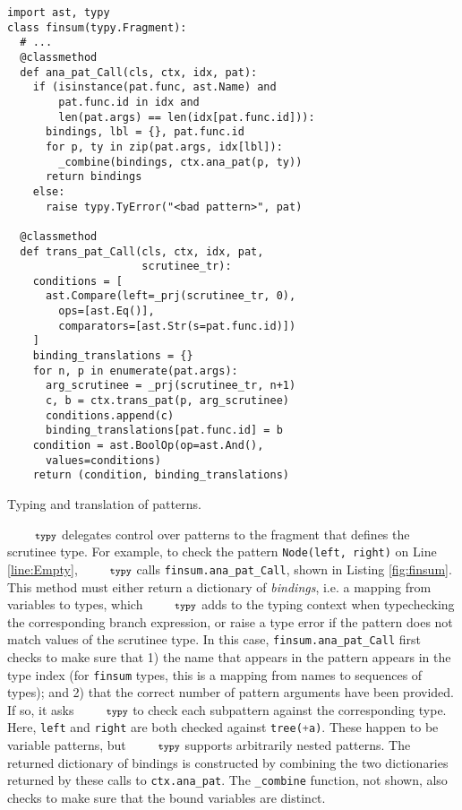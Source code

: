 \documentclass[10pt]{sigplanconf}
\newcommand{\typy}{\texttt{\footnotesize typy}}
\newcommand{\lip}[1]{\lstinline[language=Python,basicstyle=\ttfamily\footnotesize,morekeywords={with},deletendkeywords={tuple,buffer,map}]{#1}}
\newcommand{\li}[1]{\lip{#1}}
\begin{document}
\begin{codelisting}[t]
\vspace{-3px}
\begin{lstlisting}[deletendkeywords={slice}]
import ast, typy
class finsum(typy.Fragment):
  # ... 
  @classmethod
  def ana_pat_Call(cls, ctx, idx, pat):
    if (isinstance(pat.func, ast.Name) and 
        pat.func.id in idx and 
        len(pat.args) == len(idx[pat.func.id])):
      bindings, lbl = {}, pat.func.id
      for p, ty in zip(pat.args, idx[lbl]):
        _combine(bindings, ctx.ana_pat(p, ty))
      return bindings
    else:
      raise typy.TyError("<bad pattern>", pat)

  @classmethod
  def trans_pat_Call(cls, ctx, idx, pat, 
                     scrutinee_tr):
    conditions = [
      ast.Compare(left=_prj(scrutinee_tr, 0), 
        ops=[ast.Eq()],
        comparators=[ast.Str(s=pat.func.id)])
    ]
    binding_translations = {}
    for n, p in enumerate(pat.args):
      arg_scrutinee = _prj(scrutinee_tr, n+1)
      c, b = ctx.trans_pat(p, arg_scrutinee)
      conditions.append(c)
      binding_translations[pat.func.id] = b
    condition = ast.BoolOp(op=ast.And(), 
      values=conditions)
    return (condition, binding_translations)
\end{lstlisting}
\caption{Typing and translation of patterns.}
\label{fig:finsum}
\end{codelisting}

$\typy$ delegates control over patterns to the fragment that defines the scrutinee type. For example, to check the pattern \li{Node(left, right)} on Line \ref{line:Empty}, $\typy$ calls \li{finsum.ana_pat_Call}, shown in Listing \ref{fig:finsum}. This method must either return a dictionary of \emph{bindings}, i.e. a mapping from variables to types, which $\typy$ adds to the typing context when typechecking the corresponding branch expression, or raise a type error if the pattern does not match values of the scrutinee type. In this case, \li{finsum.ana_pat_Call} first checks to make sure that 1) the name that appears in the pattern appears in the type index (for \li{finsum} types, this is a mapping from names to sequences of types); and 2) that the correct number of pattern arguments have been provided. If so, it asks $\typy$ to check each subpattern against the corresponding type. Here, \li{left} and \li{right} are both checked against \li{tree(+a)}. These happen to be variable patterns, but $\typy$ supports arbitrarily nested patterns. The returned dictionary of bindings is constructed by combining the two dictionaries returned by these calls to \li{ctx.ana_pat}. The \li{_combine} function, not shown, also checks to make sure that the bound variables are distinct.
\end{document}
